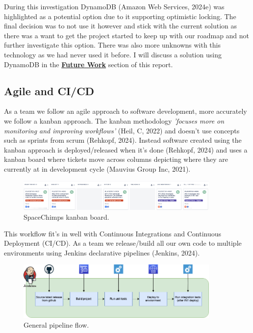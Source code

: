   During this investigation DynamoDB (Amazon Web Services, 2024e) was highlighted as a potential option due to it supporting optimistic
  locking. The final decision was to not use it however and stick with the current solution as there was a want to get the project started to keep 
  up with our roadmap and not further investigate this option. There was also more unknowns with this technology as we had never used it before.
  I will discuss a solution using DynamoDB in the \hyperref[sec:future]{\textbf{Future Work}} section of this report.
   
  \subsection{Agile and CI/CD}
  As a team we follow an agile approach to software development, more accurately we follow a kanban approach. The kanban methodology 
  \textit{'focuses more on monitoring and improving workflows'} (Heil, C, 2022) and doesn't use concepts such as sprints from scrum (Rehkopf, 2024). 
  Instead software created using the kanban approach is deployed/released when it's done (Rehkopf, 2024) and uses a kanban board where tickets move 
  across columns depicting where they are currently at in development cycle (Mauvius Group Inc, 2021).

  \begin{figure}[H]
    \centering
    \includegraphics[width=10cm]{assets/kanbanBoard.png}
    \caption{SpaceChimps kanban board.}
    \label{fig:kanbanBoard}
  \end{figure}

  This workflow fit's in well with Continuous Integrations and Continuous Deployment (CI/CD). As a team we release/build all our own code to 
  multiple environments using Jenkins declarative pipelines (Jenkins, 2024).

  \begin{figure}[H]
    \centering
    \includegraphics[width=10cm]{assets/pipeline.drawio.png}
    \caption{General pipeline flow.}
    \label{fig:pipeline}
  \end{figure}

